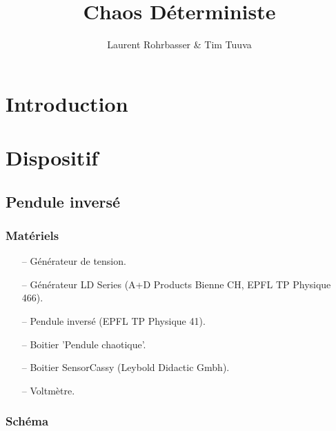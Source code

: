 \documentclass[a4paper,12pt,oneside]{article}
\begin{document}
\title{Chaos Déterministe}
\author{Laurent Rohrbasser \& Tim Tuuva}

\maketitle
\tableofcontents
\baselineskip=16pt
\parindent=15pt
\parskip=5pt

\begin{abstract}
\end{abstract}

\section{Introduction}

\newpage
\section{Dispositif}
\subsection{Pendule inversé}

\subsubsection{Matériels}
\begin{itemize}
	\item[--] Générateur de tension.
	\item[--] Générateur LD Series (A+D Products Bienne CH, EPFL TP Physique 466).
	\item[--] Pendule inversé (EPFL TP Physique 41).
	\item[--] Boitier ’Pendule chaotique’.
	\item[--] Boitier SensorCassy (Leybold Didactic Gmbh).
	\item[--] Voltmètre.
\end{itemize}

\subsubsection{Schéma}
\end{document}

